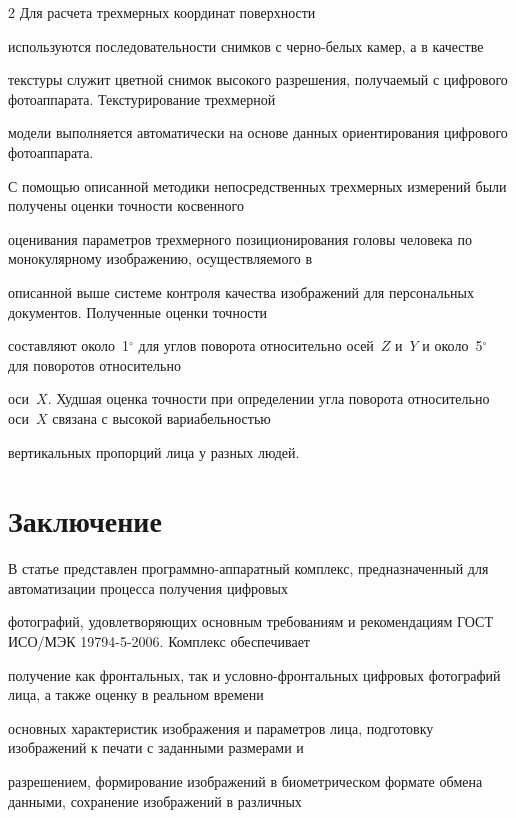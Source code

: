 \begin{multicols}{2}
Для расчета трехмерных координат по\-верх\-ности\linebreak


 используются последовательности снимков с чер\-но-бе\-лых камер, а в качестве 


текстуры служит цветной снимок высокого разрешения, по\-лу\-ча\-емый с циф\-ро\-во\-го фотоаппарата. Текстурирование трехмерной 


модели выполняется автоматически на основе данных ориентирования циф\-ро\-во\-го фотоаппарата.





С помощью описанной методики непосредственных трехмерных измерений были получены оценки точности косвенного 


оценивания па\-ра\-мет\-ров трехмерного позиционирования головы человека по монокулярному изображению, осуществляемого в 


описанной выше системе контроля качества изображений для персональных документов. Полученные оценки точности 


составляют около~1$^\circ$ для углов поворота относительно осей~$Z$ и~$Y$ и около~5$^\circ$ для поворотов относительно 


оси~$X$. Худшая оценка точности при определении угла поворота относительно оси~$X$ связана с высокой вариабельностью 


вертикальных пропорций лица у разных людей.





\section{Заключение}





В статье представлен программно-аппаратный комплекс, предназначенный для автоматизации процесса получения цифровых 


фотографий, удовле\-тво\-ря\-ющих основным требованиям и рекомендациям ГОСТ ИСО/МЭК 19794-5-2006. Комплекс обеспечивает 


получение как фронтальных, так и условно-фрон\-таль\-ных цифровых фотографий лица, а также оценку в реальном времени 


основных характеристик изображения и параметров лица, подготовку изображений к печати с заданными размерами и 


разрешением, формирование изображений в биометрическом формате обмена данными, сохранение изображений в различных 



\end{multicols}
